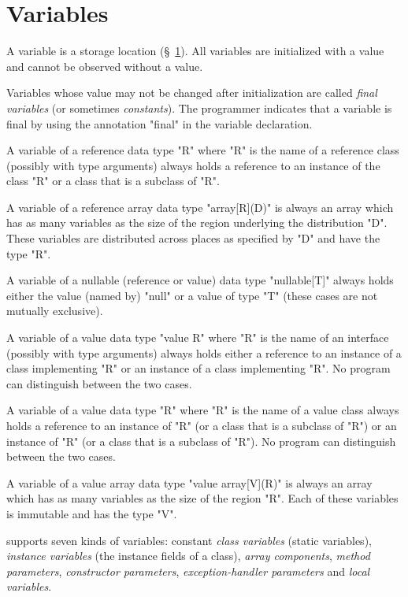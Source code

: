 
\chapter{Variables}\label{XtenVariables}

A variable is a storage location (\S~\ref{XtenVariables}). All
variables are initialized with a value and cannot be observed
without
a value.

Variables whose value may not be changed after initialization
are called {\em final variables} (or sometimes {\em constants}).
The programmer indicates that a variable is final by using the
annotation \xcd"final" in the variable declaration.


A variable of a reference data type \xcd"R" where \xcd"R" is the name
of a reference class (possibly with type arguments) always holds a
reference to an instance of the class \xcd"R" or a class that is a
subclass of \xcd"R". 

A variable of a reference array data type \xcd"array[R](D)" is always an
array which has as many variables as the size of the region underlying
the distribution \xcd"D". These variables are distributed across
places as specified by \xcd"D" and have the type \xcd"R".

A variable of a nullable (reference or value) data type \xcd"nullable[T]"
always holds either the value (named by) \xcd"null" or a value of
type \xcd"T" (these cases are not mutually exclusive).

A variable of a value data type \xcd"value R" where \xcd"R" is the
name of an interface (possibly with type arguments) always holds
either a reference to an instance of a class implementing \xcd"R" or
an instance of a class implementing \xcd"R". No program can
distinguish between the two cases.

A variable of a value data type \xcd"R" where \xcd"R" is the name of a
value class always holds a reference to an instance of \xcd"R" (or a
class that is a subclass of \xcd"R") or an instance of \xcd"R" (or a
class that is a subclass of \xcd"R"). No program can distinguish
between the two cases.

A variable of a value array data type \xcd"value array[V](R)" is always an
array which has as many variables as the size of the region \xcd"R".
Each of these variables is immutable and has the type \xcd"V".

\Xten{} supports seven kinds of variables: constant {\em class
variables} (static variables), {\em instance variables} (the instance
fields of a class), {\em array components}, {\em method parameters},
{\em constructor parameters}, {\em exception-handler parameters} and
{\em local variables}.

